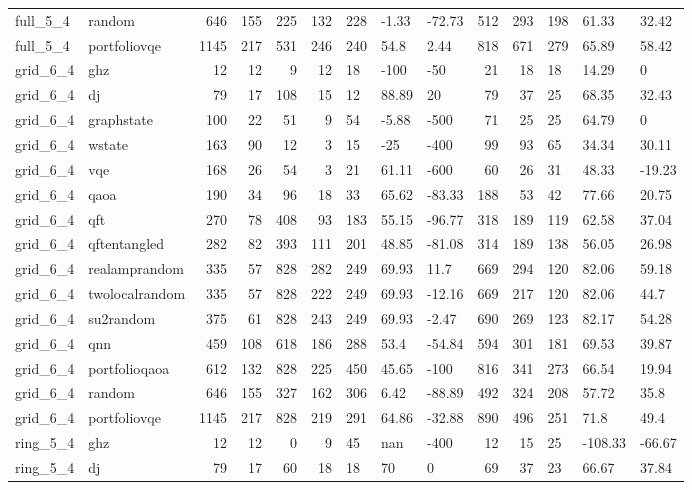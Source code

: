 \begin{longtable}{llrrrrlllrrlll}
full\_5\_4 & random & 646 & 155 & 225 & 132 & 228 & -1.33 & -72.73 & 512 & 293 & 198 & 61.33 & 32.42 \\
full\_5\_4 & portfoliovqe & 1145 & 217 & 531 & 246 & 240 & 54.8 & 2.44 & 818 & 671 & 279 & 65.89 & 58.42 \\
grid\_6\_4 & ghz & 12 & 12 & 9 & 12 & 18 & -100 & -50 & 21 & 18 & 18 & 14.29 & 0 \\
grid\_6\_4 & dj & 79 & 17 & 108 & 15 & 12 & 88.89 & 20 & 79 & 37 & 25 & 68.35 & 32.43 \\
grid\_6\_4 & graphstate & 100 & 22 & 51 & 9 & 54 & -5.88 & -500 & 71 & 25 & 25 & 64.79 & 0 \\
grid\_6\_4 & wstate & 163 & 90 & 12 & 3 & 15 & -25 & -400 & 99 & 93 & 65 & 34.34 & 30.11 \\
grid\_6\_4 & vqe & 168 & 26 & 54 & 3 & 21 & 61.11 & -600 & 60 & 26 & 31 & 48.33 & -19.23 \\
grid\_6\_4 & qaoa & 190 & 34 & 96 & 18 & 33 & 65.62 & -83.33 & 188 & 53 & 42 & 77.66 & 20.75 \\
grid\_6\_4 & qft & 270 & 78 & 408 & 93 & 183 & 55.15 & -96.77 & 318 & 189 & 119 & 62.58 & 37.04 \\
grid\_6\_4 & qftentangled & 282 & 82 & 393 & 111 & 201 & 48.85 & -81.08 & 314 & 189 & 138 & 56.05 & 26.98 \\
grid\_6\_4 & realamprandom & 335 & 57 & 828 & 282 & 249 & 69.93 & 11.7 & 669 & 294 & 120 & 82.06 & 59.18 \\
grid\_6\_4 & twolocalrandom & 335 & 57 & 828 & 222 & 249 & 69.93 & -12.16 & 669 & 217 & 120 & 82.06 & 44.7 \\
grid\_6\_4 & su2random & 375 & 61 & 828 & 243 & 249 & 69.93 & -2.47 & 690 & 269 & 123 & 82.17 & 54.28 \\
grid\_6\_4 & qnn & 459 & 108 & 618 & 186 & 288 & 53.4 & -54.84 & 594 & 301 & 181 & 69.53 & 39.87 \\
grid\_6\_4 & portfolioqaoa & 612 & 132 & 828 & 225 & 450 & 45.65 & -100 & 816 & 341 & 273 & 66.54 & 19.94 \\
grid\_6\_4 & random & 646 & 155 & 327 & 162 & 306 & 6.42 & -88.89 & 492 & 324 & 208 & 57.72 & 35.8 \\
grid\_6\_4 & portfoliovqe & 1145 & 217 & 828 & 219 & 291 & 64.86 & -32.88 & 890 & 496 & 251 & 71.8 & 49.4 \\
ring\_5\_4 & ghz & 12 & 12 & 0 & 9 & 45 & nan & -400 & 12 & 15 & 25 & -108.33 & -66.67 \\
ring\_5\_4 & dj & 79 & 17 & 60 & 18 & 18 & 70 & 0 & 69 & 37 & 23 & 66.67 & 37.84 \\

\end{longtable}
